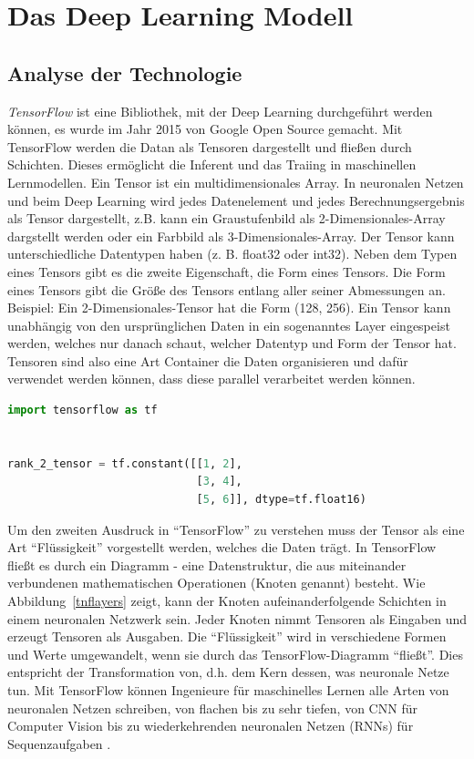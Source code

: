 \chapter{Das Deep Learning Modell}
\section{Analyse der Technologie}
\textit{TensorFlow} ist eine Bibliothek, mit der Deep Learning durchgeführt werden können, es wurde im Jahr 2015 von Google Open Source gemacht. Mit TensorFlow werden die Datan als Tensoren dargestellt und fließen durch Schichten. Dieses ermöglicht die Inferent und das Traiing in maschinellen Lernmodellen. Ein Tensor ist ein multidimensionales Array. In neuronalen Netzen und beim Deep Learning wird jedes Datenelement und jedes Berechnungsergebnis als Tensor dargestellt, z.B. kann ein Graustufenbild als 2-Dimensionales-Array dargstellt werden oder ein Farbbild als 3-Dimensionales-Array. Der Tensor kann unterschiedliche Datentypen haben (z. B. float32 oder int32). Neben dem Typen eines Tensors gibt es die zweite Eigenschaft, die Form eines Tensors. Die Form eines Tensors gibt die Größe des Tensors entlang aller seiner Abmessungen an. Beispiel: Ein 2-Dimensionales-Tensor hat die Form (128, 256). Ein Tensor kann unabhängig von den ursprünglichen Daten in ein sogenanntes Layer eingespeist werden, welches nur danach schaut, welcher Datentyp und Form der Tensor hat. Tensoren sind also eine Art Container die Daten organisieren und dafür verwendet werden können, dass diese parallel verarbeitet werden können.


\begin{lstlisting}[language=Python,caption=Beispiel eines Tensors in TensorFlow, label={Label4}]
import tensorflow as tf


rank_2_tensor = tf.constant([[1, 2],
                             [3, 4],
                             [5, 6]], dtype=tf.float16)
\end{lstlisting}

Um den zweiten Ausdruck in \enquote{TensorFlow} zu verstehen muss der Tensor als eine Art \enquote{Flüssigkeit} vorgestellt werden, welches die Daten trägt. In TensorFlow fließt es durch ein Diagramm - eine Datenstruktur, die aus miteinander verbundenen mathematischen Operationen (Knoten genannt) besteht. Wie Abbildung~\ref{tnflayers} zeigt, kann der Knoten aufeinanderfolgende Schichten in einem neuronalen Netzwerk sein. Jeder Knoten nimmt Tensoren als Eingaben und erzeugt Tensoren als Ausgaben. Die \enquote{Flüssigkeit} wird in verschiedene Formen und Werte umgewandelt, wenn sie durch das TensorFlow-Diagramm \enquote{fließt}. Dies entspricht der Transformation von, d.h. dem Kern dessen, was neuronale Netze tun. Mit TensorFlow können Ingenieure für maschinelles Lernen alle Arten von neuronalen Netzen schreiben, von flachen bis zu sehr tiefen, von CNN für Computer Vision bis zu wiederkehrenden neuronalen Netzen (RNNs) für Sequenzaufgaben .

